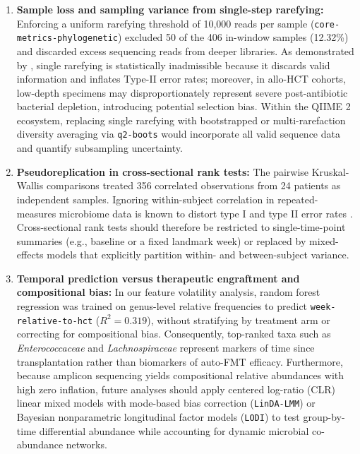\begin{enumerate}
  \item \textbf{Sample loss and sampling variance from single-step rarefying:} Enforcing a uniform rarefying threshold of 10,000 reads per sample (\texttt{core-metrics-phylogenetic}) excluded 50 of the 406 in-window samples (12.32\%) and discarded excess sequencing reads from deeper libraries. As demonstrated by \citet{mcmurdie2013waste}, single rarefying is statistically inadmissible because it discards valid information and inflates Type-II error rates; moreover, in allo-HCT cohorts, low-depth specimens may disproportionately represent severe post-antibiotic bacterial depletion, introducing potential selection bias. Within the QIIME 2 ecosystem, replacing single rarefying with bootstrapped or multi-rarefaction diversity averaging via \texttt{q2-boots} \citep{raspet2024facilitating} would incorporate all valid sequence data and quantify subsampling uncertainty.
  \item \textbf{Pseudoreplication in cross-sectional rank tests:} The pairwise Kruskal-Wallis comparisons treated 356 correlated observations from 24 patients as independent samples. Ignoring within-subject correlation in repeated-measures microbiome data is known to distort type I and type II error rates \citep{herman2024assessingb,zhou2021linda,zhang2026bayesian}. Cross-sectional rank tests should therefore be restricted to single-time-point summaries (e.g., baseline or a fixed landmark week) or replaced by mixed-effects models that explicitly partition within- and between-subject variance.
  \item \textbf{Temporal prediction versus therapeutic engraftment and compositional bias:} In our feature volatility analysis, random forest regression was trained on genus-level relative frequencies to predict \texttt{week-relative-to-hct} ($R^2 = 0.319$), without stratifying by treatment arm or correcting for compositional bias. Consequently, top-ranked taxa such as \textit{Enterococcaceae} and \textit{Lachnospiraceae} represent markers of time since transplantation rather than biomarkers of auto-FMT efficacy. Furthermore, because amplicon sequencing yields compositional relative abundances with high zero inflation, future analyses should apply centered log-ratio (CLR) linear mixed models with mode-based bias correction (\texttt{LinDA-LMM}) \citep{zhou2021linda} or Bayesian nonparametric longitudinal factor models (\texttt{LODI}) \citep{zhang2026bayesian} to test group-by-time differential abundance while accounting for dynamic microbial co-abundance networks.
\end{enumerate}

